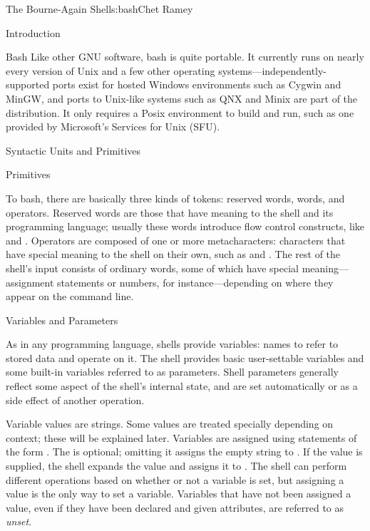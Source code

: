 \begin{aosachapter}{The Bourne-Again Shell}{s:bash}{Chet Ramey}
\begin{aosasect1}{Introduction}
\begin{aosasect2}{Bash}
Like other GNU software, bash is quite portable.  It currently runs on
nearly every version of Unix and a few other operating
systems---independently-supported ports exist for hosted Windows
environments such as Cygwin and MinGW, and ports to Unix-like systems
such as QNX and Minix are part of the distribution.  It only requires
a Posix environment to build and run, such as one provided by
Microsoft's Services for Unix (SFU).

\end{aosasect2}

\end{aosasect1}

\begin{aosasect1}{Syntactic Units and Primitives}

\begin{aosasect2}{Primitives}

To bash, there are basically three kinds of tokens: reserved
words, words, and operators.  Reserved words are those that have
meaning to the shell and its programming language; usually these words
introduce flow control constructs, like  and .
Operators are composed of one or more metacharacters: characters that
have special meaning to the shell on their own, such as \code{|} and
\code{{\textgreater}}.  The rest of the shell's input consists of
ordinary words, some of which have special meaning---assignment
statements or numbers, for instance---depending on where they appear
on the command line.

\end{aosasect2}

\begin{aosasect2}{Variables and Parameters}

As in any programming language, shells provide variables: names to
refer to stored data and operate on it.  The shell provides basic
user-settable variables and some built-in variables referred to as
parameters.  Shell parameters generally reflect some aspect of the
shell's internal state, and are set automatically or as a side effect
of another operation.

Variable values are strings.  Some values are treated specially
depending on context; these will be explained later.  Variables are
assigned using statements of the form .  The
 is optional; omitting it assigns the empty string to
.  If the value is supplied, the shell expands the value
and assigns it to .  The shell can perform different
operations based on whether or not a variable is set, but assigning a
value is the only way to set a variable.  Variables that have not been
assigned a value, even if they have been declared and given
attributes, are referred to as \emph{unset}.


\end{aosasect2}
\end{aosasect1}
\end{aosachapter}
